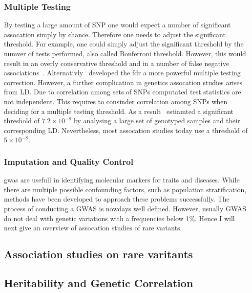 \subsubsection{Multiple Testing}
\label{ssub:multiple_testing}
By testing a large amount of SNP one would expect a number of significant assocation simply by chance.
Therefore one needs to adjust the significant threshold.
For example, one could simply adjust the significant threshold by the numver of tests performed, also called Bonferroni threshold.
However, this would result in an overly conservative threshold and in a number of false negative associations~\cite{Benjamini1995}.
Alternativly~\citet{Benjamini1995} developed the \acrfull{fdr} a more powerful multiple testing correction. 
However, a further complication in genetics assocation studies arises from LD\@.
Due to correlation among sets of SNPs computated test statistics are not independent.
This requires to consinder correlation among SNPs when deciding for a multiple testing threshold.
As a result~\citet{Dudbridge2008} estiamted a significant threshold of $7.2 \times 10^{-8}$ by analysing a large set of genotyped samples and their corresponding LD\@.
Nevertheless, most assocation studies today use a threshold of $5\times 10^{-8}$. %

\subsubsection{Imputation and Quality Control}
\label{ssub:imputation_and_quality_control}


\vfill
\acrlong{gwas} are usefull in identifying molecular markers for traits and diseases.
While there are multiple possible confounding factors, such as population stratification, methods have been developed to approach these problems successfully.
The process of conducting a GWAS is nowdays well defined.
However, usually GWAS do not deal with genetic variations with a frequencies below 1\%.
Hence I will next give an overview of assocation studies of rare variants.

\subsection{Association studies on rare varitants}
\label{sub:association_studies_on_rare_varitants}

\subsection{Heritability and Genetic Correlation}
\label{sub:heritability_and_genetic_correlation}


